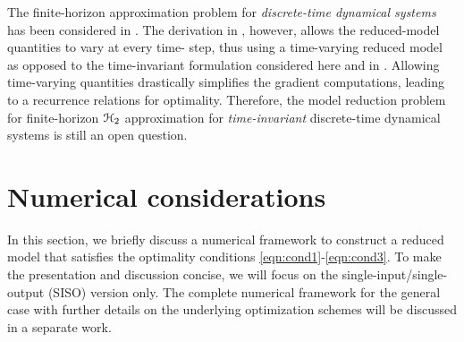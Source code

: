 \documentclass[twocolumn]{autart}
\begin{document}
\begin{remark}
The finite-horizon approximation problem for  \emph{discrete-time dynamical systems} has been considered 
in \cite{MelVG14}. The derivation in \cite{MelVG14}, however, allows the reduced-model quantities to vary at every time- step, thus using a time-varying reduced model as opposed to the time-invariant formulation considered here and in  \cite{GoyR17}. Allowing time-varying quantities drastically simplifies the gradient computations, leading to a recurrence relations for optimality. Therefore, the model reduction problem for finite-horizon $\EuScript{H}_2$ approximation for \emph{time-invariant} discrete-time dynamical systems is still an open question.
\end{remark}
\section{Numerical considerations}  \label{sec:num}
In this section, we briefly discuss a numerical framework to construct a reduced model that satisfies the optimality conditions \eqref{eqn:cond1}-\eqref{eqn:cond3}. To make the presentation and discussion concise,  we will focus on the single-input/single-output (SISO) version only. The complete numerical framework for the general case  with further details on the underlying optimization schemes will be discussed in a separate work.
\end{document}
